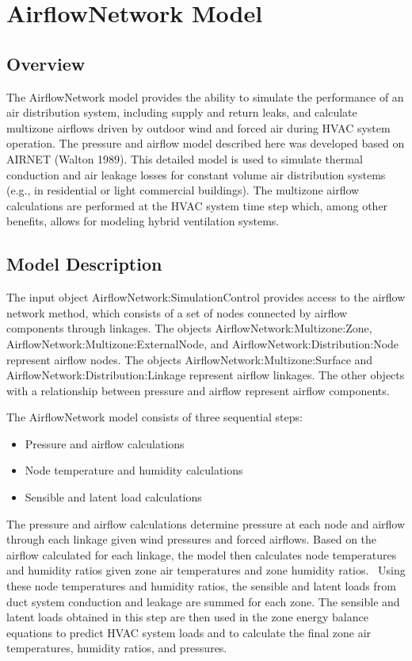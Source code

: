 \section{AirflowNetwork Model}\label{airflownetwork-model}

\subsection{Overview}\label{afn-overview}

The AirflowNetwork model provides the ability to simulate the performance of an air distribution system, including supply and return leaks, and calculate multizone airflows driven by outdoor wind and forced air during HVAC system operation. The pressure and airflow model described here was developed based on AIRNET (Walton 1989). This detailed model is used to simulate thermal conduction and air leakage losses for constant volume air distribution systems (e.g., in residential or light commercial buildings). The multizone airflow calculations are performed at the HVAC system time step which, among other benefits, allows for modeling hybrid ventilation systems.

\subsection{Model Description}\label{afn-model-description}

The input object AirflowNetwork:SimulationControl provides access to the airflow network method, which consists of a set of nodes connected by airflow components through linkages. The objects AirflowNetwork:Multizone:Zone, AirflowNetwork:Multizone:ExternalNode, and AirflowNetwork:Distribution:Node represent airflow nodes. The objects AirflowNetwork:Multizone:Surface and AirflowNetwork:Distribution:Linkage represent airflow linkages. The other objects with a relationship between pressure and airflow represent airflow components.

The AirflowNetwork model consists of three sequential steps:

\begin{itemize}
\item
  Pressure and airflow calculations
\item
  Node temperature and humidity calculations
\item
  Sensible and latent load calculations
\end{itemize}

The pressure and airflow calculations determine pressure at each node and airflow through each linkage given wind pressures and forced airflows. Based on the airflow calculated for each linkage, the model then calculates node temperatures and humidity ratios given zone air temperatures and zone humidity ratios.~ Using these node temperatures and humidity ratios, the sensible and latent loads from duct system conduction and leakage are summed for each zone. The sensible and latent loads obtained in this step are then used in the zone energy balance equations to predict HVAC system loads and to calculate the final zone air temperatures, humidity ratios, and pressures.

